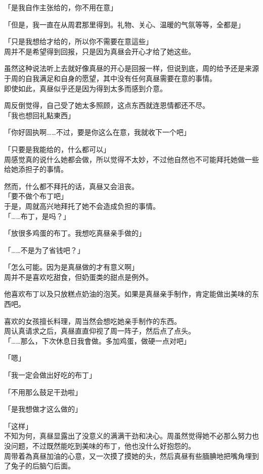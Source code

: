 「是我自作主张给的，你不用在意」

「但是，我一直在从周君那里得到。礼物、关心、温暖的气氛等等，全都是」%

「只是我想给才给的，所以你不需要在意這些」\\

周并不是希望得到回报，只是因为真昼会开心才给了她这些。

虽然这种说法听上去就好像真昼的开心是回报一样，但说到底，周的给予还是来源于周的自我满足和自身的愿望，其中没有任何真昼需要在意的事情。\\

即使如此，真昼似乎还是因为得到太多而感到介意。

周反倒觉得，自己受了她太多照顾，这点东西就连恩情都还不尽。\\

「我也想回礼點東西」

「你好固执啊……不过，要是你这么在意，我就收下一个吧」

「只要是我能给的，什么都可以」\\

周感觉真的说什么她都会做，所以觉得不太妙，不过他自然也不可能拜托她做一些给她添担子的事情。

然而，什么都不拜托的话，真昼又会沮丧。\\

「要不做个布丁吧」\\

于是，周就高兴地拜托了她不会造成负担的事情。\\

「……布丁，是吗？」

「放很多鸡蛋的布丁。我想吃真昼亲手做的」

「……不是为了省钱吧？」

「怎么可能。因为是真昼做的才有意义啊」\\

周并不是喜欢吃甜食，但奶蛋类的甜点是例外。

他喜欢布丁以及只放糕点奶油的泡芙。如果是真昼亲手制作，肯定能做出美味的东西吧。

喜欢的女孩擅长料理，周当然会想吃她亲手制作的东西。\\

周认真请求之后，真昼直直仰视了周一阵子，然后点了点头。\\

「……那么，下次休息日我會做。多加鸡蛋，做硬一点对吧」

「嗯」

「我一定会做出好吃的布丁」

「不用那么鼓足干劲啦」

「是我想做才这么做的」

「这样」\\

不知为何，真昼显露出了没意义的满满干劲和决心。周虽然觉得她不必那么努力也没问题，不过既然能吃到美味的布丁，他也没什么好抱怨的。\\

周带着為真昼加油的心意，又一次摸了摸她的头，然后真昼有些腼腆地把嘴角埋到了兔子的后脑勺后面。%

